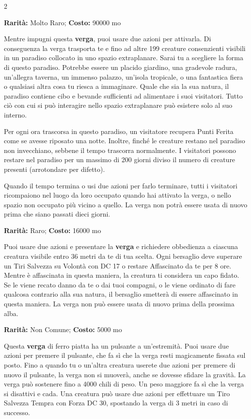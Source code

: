 \begin{multicols}{2}

\textbf{Rarità:} Molto Raro; \textbf{Costo:} 90000 mo

Mentre impugni questa \textbf{verga}, puoi usare due azioni per attivarla. Di conseguenza la verga trasporta te e fino ad altre 199 creature consenzienti visibili in un paradiso collocato in uno spazio extraplanare. Sarai tu a scegliere la forma di questo paradiso. Potrebbe essere un placido giardino, una gradevole radura, un'allegra taverna, un immenso palazzo, un'isola tropicale, o una fantastica fiera o qualsiasi altra cosa tu riesca a immaginare. Quale che sia la sua natura, il paradiso contiene cibo e bevande sufficienti ad alimentare i suoi visitatori. Tutto ciò con cui si può interagire nello spazio extraplanare può esistere solo al suo interno.

Per ogni ora trascorsa in questo paradiso, un visitatore recupera Punti Ferita come se avesse riposato una notte. Inoltre, finché le creature restano nel paradiso non invecchiano, sebbene il tempo trascorra normalmente. I visitatori possono restare nel paradiso per un massimo di 200 giorni diviso il numero di creature presenti (arrotondare per difetto).

Quando il tempo termina o usi due azioni per farlo terminare, tutti i visitatori ricompaiono nel luogo da loro occupato quando hai attivato la verga, o nello spazio non occupato più vicino a quello. La verga non potrà essere usata di nuovo prima che siano passati dieci giorni.


\textbf{Rarità:} Raro; \textbf{Costo:} 16000 mo

Puoi usare due azioni e presentare la \textbf{verga} e richiedere obbedienza a ciascuna creatura visibile entro 36 metri da te di tua scelta. Ogni bersaglio deve superare un Tiri Salvezza su Volontà con DC 17 o restare Affascinato da te per 8 ore. Mentre è affascinata in questa maniera, la creatura ti considera un capo fidato. Se le viene recato danno da te o dai tuoi compagni, o le viene ordinato di fare qualcosa contrario alla sua natura, il bersaglio smetterà di essere affascinato in questa maniera. La verga non può essere usata di nuovo prima della prossima alba.


\textbf{Rarità:} Non Comune; \textbf{Costo:} 5000 mo

Questa \textbf{verga} di ferro piatta ha un pulsante a un'estremità. Puoi usare due azioni per premere il pulsante, che fa sì che la verga resti magicamente fissata sul posto. Fino a quando tu o un'altra creatura userete due azioni per premere di nuovo il pulsante, la verga non si muoverà, anche se dovesse sfidare la gravità. La verga può sostenere fino a 4000 chili di peso. Un peso maggiore fa sì che la verga si disattivi e cada. Una creatura può usare due azioni per effettuare un Tiro Salvezza Tempra con Forza DC 30, spostando la verga di 3 metri in caso di successo.


\end{multicols}
